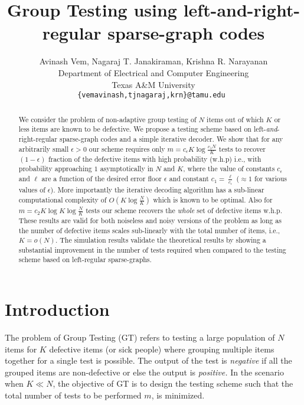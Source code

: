 \documentclass[conference,twocolumn]{IEEEtran}
\def\ceps{c_{\epsilon}}
\begin{document}
\title{Group Testing using left-and-right-regular sparse-graph codes}
\author{Avinash Vem, Nagaraj T. Janakiraman, Krishna R. Narayanan\\
Department of Electrical and Computer Engineering \\
Texas A\&M University\\
{\tt\small {\{vemavinash,tjnagaraj,krn\}@tamu.edu} }}

\maketitle
\begin{abstract}
We consider the problem of non-adaptive group testing of $N$ items out of which $K$ or less items are known to be defective. We propose a testing scheme based on left-{\em and}-right-regular sparse-graph codes and a simple iterative decoder. We show that for any arbitrarily small $\epsilon>0$ our scheme requires only $m=\ceps K\log \frac{c_1N}{K}$ tests to recover $(1-\epsilon)$ fraction of the defective items with high probability (w.h.p) i.e., with probability approaching $1$ asymptotically in $N$ and $K$, where the value of constants $\ceps$ and $\ell$ are a function of the desired error floor $\epsilon$ and constant $c_1=\frac{\ell}{\ceps}$ ($\approx 1$ for various values of $\epsilon$). More importantly the iterative decoding algorithm has a sub-linear computational complexity of $O(K\log \frac{N}{K})$ which is known to be optimal. Also for $m=c_2 K\log K\log \frac{N}{K}$ tests our scheme recovers the \textit{whole} set of defective items w.h.p. These results are valid for both noiseless and noisy versions of the problem as long as the number of defective items scales sub-linearly with the total number of items, i.e., $K=o(N)$. The simulation results validate the theoretical results by showing a substantial improvement in the number of tests required when compared to the testing scheme based on left-regular sparse-graphs.
\end{abstract}

\section{Introduction}
The problem of Group Testing (GT) refers to testing a large population of $N$ items for $K$ defective items (or sick people) where grouping multiple items together for a single test is possible. The output of the test is \textit{negative} if all the grouped items are non-defective or else the output is \textit{positive.} In the scenario when $K \ll N$, the objective of GT is to design the testing scheme such that the total number of tests to be performed $m$, is minimized.
\end{document}
